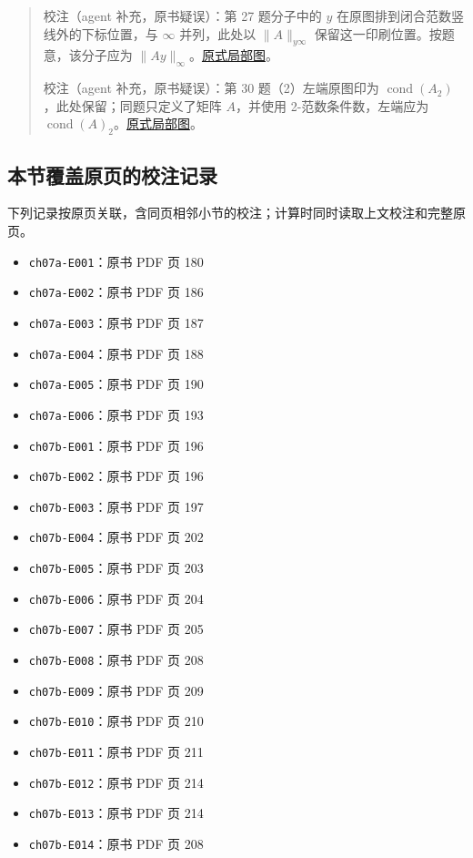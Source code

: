 \documentclass[
  10pt,
  fontset=fandol]{ctexart}
\providecommand{\tightlist}{%
  \setlength{\itemsep}{0pt}\setlength{\parskip}{0pt}}
\begin{document}
\begin{quote}
校注（agent 补充，原书疑误）：第 27 题分子中的 \(y\) 在原图排到闭合范数竖线外的下标位置，与 \(\infty\) 并列，此处以 \(\|A\|_{y\infty}\) 保留这一印刷位置。按题意，该分子应为 \(\|Ay\|_\infty\)。\href{../assets/ch07b/214-ex27.png}{原式局部图}。

校注（agent 补充，原书疑误）：第 30 题（2）左端原图印为 \(\operatorname{cond}(A_2)\)，此处保留；同题只定义了矩阵 \(A\)，并使用 2-范数条件数，左端应为 \(\operatorname{cond}(A)_2\)。\href{../assets/ch07b/214-ex30.png}{原式局部图}。
\end{quote}

\subsection{本节覆盖原页的校注记录}\label{ux672cux8282ux8986ux76d6ux539fux9875ux7684ux6821ux6ce8ux8bb0ux5f55}

下列记录按原页关联，含同页相邻小节的校注；计算时同时读取上文校注和完整原页。

\begin{itemize}
\tightlist
\item
  \texttt{ch07a-E001}：原书 PDF 页 180
\item
  \texttt{ch07a-E002}：原书 PDF 页 186
\item
  \texttt{ch07a-E003}：原书 PDF 页 187
\item
  \texttt{ch07a-E004}：原书 PDF 页 188
\item
  \texttt{ch07a-E005}：原书 PDF 页 190
\item
  \texttt{ch07a-E006}：原书 PDF 页 193
\item
  \texttt{ch07b-E001}：原书 PDF 页 196
\item
  \texttt{ch07b-E002}：原书 PDF 页 196
\item
  \texttt{ch07b-E003}：原书 PDF 页 197
\item
  \texttt{ch07b-E004}：原书 PDF 页 202
\item
  \texttt{ch07b-E005}：原书 PDF 页 203
\item
  \texttt{ch07b-E006}：原书 PDF 页 204
\item
  \texttt{ch07b-E007}：原书 PDF 页 205
\item
  \texttt{ch07b-E008}：原书 PDF 页 208
\item
  \texttt{ch07b-E009}：原书 PDF 页 209
\item
  \texttt{ch07b-E010}：原书 PDF 页 210
\item
  \texttt{ch07b-E011}：原书 PDF 页 211
\item
  \texttt{ch07b-E012}：原书 PDF 页 214
\item
  \texttt{ch07b-E013}：原书 PDF 页 214
\item
  \texttt{ch07b-E014}：原书 PDF 页 208
\end{itemize}
\end{document}
